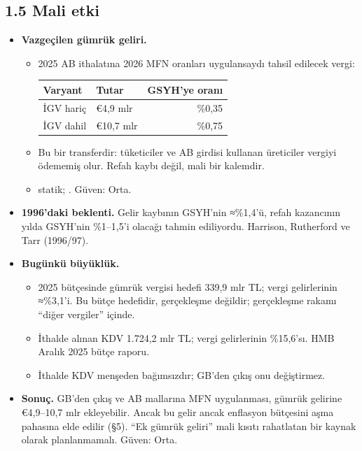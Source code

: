 \hypertarget{01_teshis-15-mali-etki}{%
\subsection{1.5 Mali etki}\label{01_teshis-15-mali-etki}}

\begin{itemize}
\tightlist
\item
  \textbf{Vazgeçilen gümrük geliri.}

  \begin{itemize}
  \item
    2025 AB ithalatına 2026 MFN oranları uygulansaydı tahsil edilecek vergi:

    \begingroup\gbtablo\small

    \begin{longtable}[]{@{}llr@{}}
    \toprule\noalign{}
    \textbf{Varyant} & \textbf{Tutar} & \textbf{GSYH'ye oranı} \\
    \midrule\noalign{}
    \endhead
    \bottomrule\noalign{}
    \endlastfoot
    İGV hariç & €4,9 mlr & \%0,35 \\
    İGV dahil & €10,7 mlr & \%0,75 \\
    \end{longtable}

    \endgroup
  \item
    Bu bir transferdir: tüketiciler ve AB girdisi kullanan üreticiler vergiyi ödememiş olur. Refah kaybı değil, mali bir kalemdir.
  \item
    \etiketT{} statik; . Güven: Orta.
  \end{itemize}
\item
  \textbf{1996'daki beklenti.} Gelir kaybının GSYH'nin ≈\%1,4'ü, refah kazancının yılda GSYH'nin \%1--1,5'i olacağı tahmin ediliyordu. \etiketD{} Harrison, Rutherford ve Tarr (1996/97).
\item
  \textbf{Bugünkü büyüklük.}

  \begin{itemize}
  \tightlist
  \item
    2025 bütçesinde gümrük vergisi hedefi 339,9 mlr TL; vergi gelirlerinin ≈\%3,1'i. \etiketD{} Bu bütçe hedefidir, gerçekleşme değildir; gerçekleşme rakamı ``diğer vergiler'' içinde.
  \item
    İthalde alınan KDV 1.724,2 mlr TL; vergi gelirlerinin \%15,6'sı. \etiketV{} HMB Aralık 2025 bütçe raporu.
  \item
    İthalde KDV menşeden bağımsızdır; GB'den çıkış onu değiştirmez.
  \end{itemize}
\item
  \textbf{Sonuç.} GB'den çıkış ve AB mallarına MFN uygulanması, gümrük gelirine €4,9--10,7 mlr ekleyebilir. Ancak bu gelir ancak enflasyon bütçesini aşma pahasına elde edilir (§5). ``Ek gümrük geliri'' mali kısıtı rahatlatan bir kaynak olarak planlanmamalı. \etiketT{} Güven: Orta.
\end{itemize}

